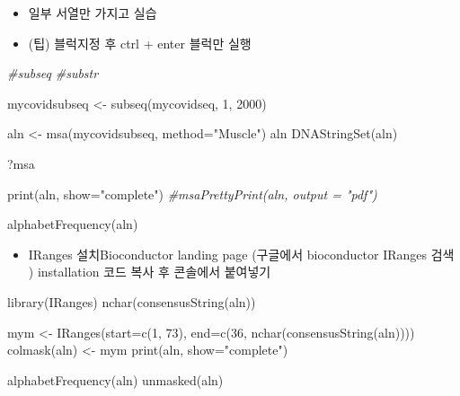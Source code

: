 \documentclass[
]{book}
\newenvironment{Shaded}{\begin{snugshade}}{\end{snugshade}}
\newcommand{\AttributeTok}[1]{\textcolor[rgb]{0.77,0.63,0.00}{#1}}
\newcommand{\CommentTok}[1]{\textcolor[rgb]{0.56,0.35,0.01}{\textit{#1}}}
\newcommand{\DecValTok}[1]{\textcolor[rgb]{0.00,0.00,0.81}{#1}}
\newcommand{\FunctionTok}[1]{\textcolor[rgb]{0.00,0.00,0.00}{#1}}
\newcommand{\NormalTok}[1]{#1}
\newcommand{\OtherTok}[1]{\textcolor[rgb]{0.56,0.35,0.01}{#1}}
\newcommand{\StringTok}[1]{\textcolor[rgb]{0.31,0.60,0.02}{#1}}
\providecommand{\tightlist}{%
  \setlength{\itemsep}{0pt}\setlength{\parskip}{0pt}}
\begin{document}
\begin{itemize}
\tightlist
\item
  일부 서열만 가지고 실습
\item
  (팁) 블럭지정 후 ctrl + enter 블럭만 실행
\end{itemize}

\begin{Shaded}
\begin{Highlighting}[]
\CommentTok{\#subseq}
\CommentTok{\#substr}


\NormalTok{mycovidsubseq }\OtherTok{\textless{}{-}} \FunctionTok{subseq}\NormalTok{(mycovidseq, }\DecValTok{1}\NormalTok{, }\DecValTok{2000}\NormalTok{)}

\NormalTok{aln }\OtherTok{\textless{}{-}} \FunctionTok{msa}\NormalTok{(mycovidsubseq, }\AttributeTok{method=}\StringTok{"Muscle"}\NormalTok{)}
\NormalTok{aln}
\FunctionTok{DNAStringSet}\NormalTok{(aln)}

\NormalTok{?msa}

\FunctionTok{print}\NormalTok{(aln, }\AttributeTok{show=}\StringTok{"complete"}\NormalTok{)}
\CommentTok{\#msaPrettyPrint(aln, output = "pdf")}

\FunctionTok{alphabetFrequency}\NormalTok{(aln)}
\end{Highlighting}
\end{Shaded}

\begin{itemize}
\tightlist
\item
  IRanges 설치Bioconductor landing page (구글에서 bioconductor IRanges 검색 ) installation 코드 복사 후 콘솔에서 붙여넣기
\end{itemize}

\begin{Shaded}
\begin{Highlighting}[]
\FunctionTok{library}\NormalTok{(IRanges)}
\FunctionTok{nchar}\NormalTok{(}\FunctionTok{consensusString}\NormalTok{(aln))}

\NormalTok{mym }\OtherTok{\textless{}{-}} \FunctionTok{IRanges}\NormalTok{(}\AttributeTok{start=}\FunctionTok{c}\NormalTok{(}\DecValTok{1}\NormalTok{, }\DecValTok{73}\NormalTok{), }\AttributeTok{end=}\FunctionTok{c}\NormalTok{(}\DecValTok{36}\NormalTok{, }\FunctionTok{nchar}\NormalTok{(}\FunctionTok{consensusString}\NormalTok{(aln))))}
\FunctionTok{colmask}\NormalTok{(aln) }\OtherTok{\textless{}{-}}\NormalTok{ mym}
\FunctionTok{print}\NormalTok{(aln, }\AttributeTok{show=}\StringTok{"complete"}\NormalTok{)}

\FunctionTok{alphabetFrequency}\NormalTok{(aln)}
\FunctionTok{unmasked}\NormalTok{(aln)}
\end{Highlighting}
\end{Shaded}
\end{document}
